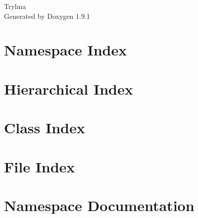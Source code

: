 \let\mypdfximage\pdfximage\def\pdfximage{\immediate\mypdfximage}\documentclass[twoside]{book}
\newcommand{\+}{\discretionary{\mbox{\scriptsize$\hookleftarrow$}}{}{}}
\newcommand{\clearemptydoublepage}{%
  \newpage{\pagestyle{empty}\cleardoublepage}%
}
\begin{document}
\raggedbottom

\hypersetup{pageanchor=false,
             bookmarksnumbered=true,
             pdfencoding=unicode
            }
\begin{titlepage}
\vspace*{7cm}
\begin{center}%
{\Large Trylma }\\
\vspace*{1cm}
{\large Generated by Doxygen 1.9.1}\\
\end{center}
\end{titlepage}
\clearemptydoublepage
{}
\tableofcontents
\clearemptydoublepage
{}
\hypersetup{pageanchor=true}

\chapter{Namespace Index}

\chapter{Hierarchical Index}

\chapter{Class Index}

\chapter{File Index}

\chapter{Namespace Documentation}








\end{document}
